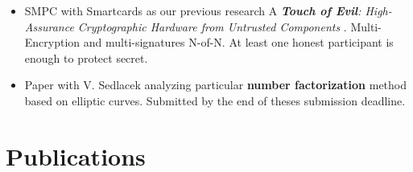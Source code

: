 \documentclass[
  digital, %
  twoside, %
  table,   %
  lof,     %
  lot,     %
]{fithesis3}
\theoremstyle{definition}
\theoremstyle{remark}
\begin{document}
\begin{ecmmnt}
\begin{itemize}
	\item SMPC with Smartcards as our previous research A {\it {\bf{Touch of Evil}}: High-Assurance Cryptographic Hardware from Untrusted Components} \cite{2017-ccs-mavroudis}. Multi-Encryption and multi-signatures N-of-N. At least one honest participant is enough to protect secret.
	
	\item Paper with V. Sedlacek analyzing particular {\bf{number factorization}} method based on elliptic curves. Submitted by the end of theses submission deadline.
	
\end{itemize}
\end{ecmmnt}

\section{Publications}\label{sec:res:pubs}

\newcommand{\citemypub}[1]{\cite{#1}: \fullcite{#1}.\newline}
\end{document}
